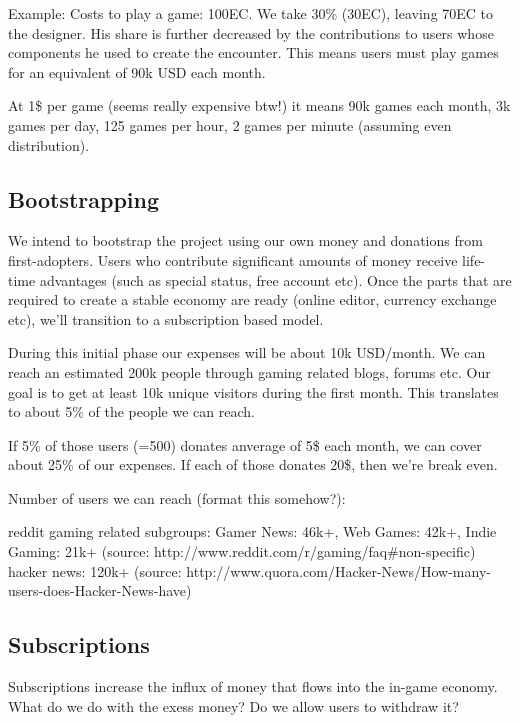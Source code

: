 \documentclass[10pt]{scrartcl}
\begin{document}
Example: Costs to play a game: 100EC. We take 30\% (30EC), leaving 70EC to the
designer. His share is further decreased by the contributions to users whose
components he used to create the encounter. This means users must play games
for an equivalent of 90k USD each month.

At 1\$ per game (seems really expensive btw!) it means 90k games each month,
3k games per day, 125 games per hour, 2 games per minute (assuming even
distribution).

\subsection{Bootstrapping}

We intend to bootstrap the project using our own money and donations from
first-adopters. Users who contribute significant amounts of money receive
life-time advantages (such as special status, free account etc). Once the
parts that are required to create a stable economy are ready (online editor,
currency exchange etc), we'll transition to a subscription based model.

During this initial phase our expenses will be about 10k USD/month. We can
reach an estimated 200k people through gaming related blogs, forums etc. Our
goal is to get at least 10k unique visitors during the first month. This
translates to about 5\% of the people we can reach.

If 5\% of those users (=500) donates anverage of 5\$ each month, we can cover
about 25\% of our expenses. If each of those donates 20\$, then we're break
even.

Number of users we can reach (format this somehow?):

    reddit gaming related subgroups: Gamer News: 46k+, Web Games: 42k+, Indie Gaming: 21k+ (source: http://www.reddit.com/r/gaming/faq\#non-specific)
    hacker news: 120k+ (source: http://www.quora.com/Hacker-News/How-many-users-does-Hacker-News-have)

\subsection{Subscriptions}

Subscriptions increase the influx of money that flows into the in-game
economy.  What do we do with the exess money? Do we allow users to withdraw
it?
\end{document}
